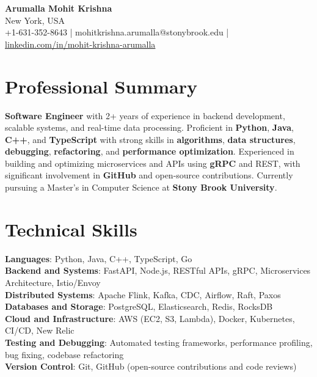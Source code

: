 \documentclass[letterpaper,11pt]{article}
\begin{document}
\begin{center}
  {\Large \textbf{Arumalla Mohit Krishna}} \\
  New York, USA \\
  +1-631-352-8643 \enspace | \enspace mohitkrishna.arumalla@stonybrook.edu \enspace | \enspace \href{https://www.linkedin.com/in/mohit-krishna-arumalla}{linkedin.com/in/mohit-krishna-arumalla}
\end{center}

\section{Professional Summary}
  \begin{itemize}[leftmargin=0.15in, label={}]
    \small{\item{
     \textbf{Software Engineer} with 2+ years of experience in backend development, scalable systems, and real-time data processing. Proficient in \textbf{Python}, \textbf{Java}, \textbf{C++}, and \textbf{TypeScript} with strong skills in \textbf{algorithms}, \textbf{data structures}, \textbf{debugging}, \textbf{refactoring}, and \textbf{performance optimization}. Experienced in building and optimizing microservices and APIs using \textbf{gRPC} and REST, with significant involvement in \textbf{GitHub} and open-source contributions. Currently pursuing a Master’s in Computer Science at \textbf{Stony Brook University}.
    }}
  \end{itemize}
\vspace{-16pt}

\section{Technical Skills}
 \begin{itemize}[leftmargin=0.15in, label={}]
    \small{\item{
     \textbf{Languages}: Python, Java, C++, TypeScript, Go \\
     \textbf{Backend and Systems}: FastAPI, Node.js, RESTful APIs, gRPC, Microservices Architecture, Istio/Envoy \\
     \textbf{Distributed Systems}: Apache Flink, Kafka, CDC, Airflow, Raft, Paxos \\
     \textbf{Databases and Storage}: PostgreSQL, Elasticsearch, Redis, RocksDB \\
     \textbf{Cloud and Infrastructure}: AWS (EC2, S3, Lambda), Docker, Kubernetes, CI/CD, New Relic \\
     \textbf{Testing and Debugging}: Automated testing frameworks, performance profiling, bug fixing, codebase refactoring \\
     \textbf{Version Control}: Git, GitHub (open-source contributions and code reviews)
    }}
 \end{itemize}
\vspace{-16pt}
\end{document}

